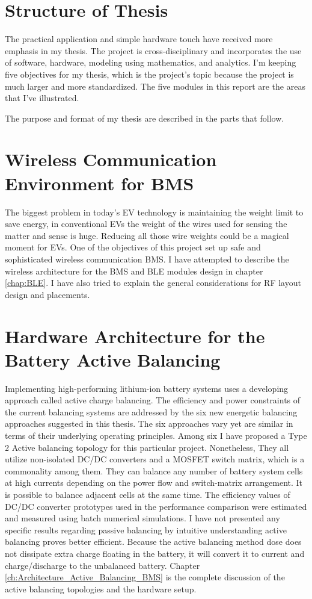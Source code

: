 
\section*{Structure of Thesis}
The practical application and simple hardware touch have received more emphasis in my thesis. The project is cross-disciplinary and incorporates the use of software, hardware, modeling using mathematics, and analytics. I'm keeping five objectives for my thesis, which is the project's topic because the project is much larger and more standardized.
The five modules in this report are the areas that I've illustrated.

The purpose and format of my thesis are described in the parts that follow.

\section*{Wireless Communication Environment for BMS}
The biggest problem in today's EV technology is maintaining the weight limit to save energy, in conventional EVs the weight of the wires used for sensing the matter and sense is huge.  Reducing all those wire weights could be a magical moment for EVs. One of the objectives of this project set up safe and sophisticated wireless communication BMS. I have attempted to describe the wireless architecture for the BMS and BLE modules design in chapter \ref{chap:BLE}. I have also tried to explain the general considerations for RF layout design and placements. 

\section*{Hardware Architecture for the Battery Active Balancing }
Implementing high-performing lithium-ion battery systems uses a developing approach called active charge balancing. The efficiency and power constraints of the current balancing systems are addressed by the six new energetic balancing approaches suggested in this thesis. The six approaches vary yet are similar in terms of their underlying operating principles. Among six I have proposed a Type 2 Active balancing topology for this particular project. Nonetheless, They all utilize non-isolated DC/DC converters and a MOSFET switch matrix, which is a commonality among them. They can balance any number of battery system cells at high currents depending on the power flow and switch-matrix arrangement. It is possible to balance adjacent cells at the same time. The efficiency values of DC/DC converter prototypes used in the performance comparison were estimated and measured using batch numerical simulations. I have not presented any specific results regarding passive balancing by intuitive understanding active balancing proves better efficient. Because the active balancing method dose does not dissipate extra charge floating in the battery, it will convert it to current and charge/discharge to the unbalanced battery. Chapter \ref{ch:Architecture_Active_Balancing_BMS} is the complete discussion of the active balancing topologies and the hardware setup.

